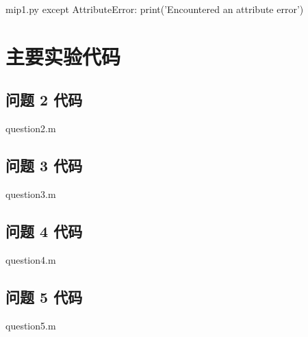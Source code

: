 \documentclass[bwprint]{gmcmthesis}
\begin{document}
\begin{appendices}
\begin{Python}{mip1.py}
except AttributeError:
    print('Encountered an attribute error')
\end{Python}

\clearpage
\section{主要实验代码}%
\vspace{-2ex} 
\subsection{问题 2 代码}
\begin{Matlab}{question2.m}
\end{Matlab}

\subsection{问题 3 代码}
\begin{Matlab}{question3.m}
\end{Matlab}

\subsection{问题 4 代码}
\begin{Matlab}{question4.m}
\end{Matlab}

\subsection{问题 5 代码}
\begin{Matlab}{question5.m}
\end{Matlab}

\end{appendices}
\end{document}
